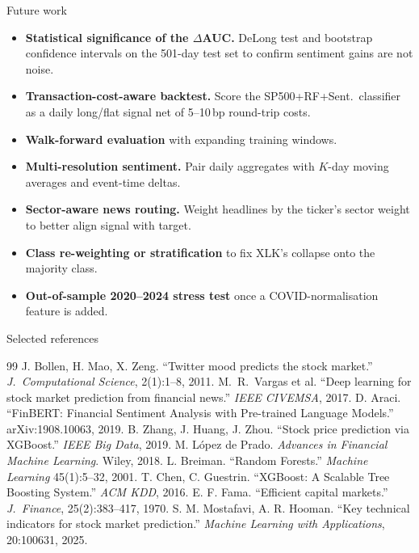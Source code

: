 \documentclass[aspectratio=169,11pt]{beamer}
\newcommand{\heading}[1]{{\color{TecBlue}\textbf{#1}}}
\begin{document}
\begin{frame}{Future work}
\footnotesize
\begin{itemize}\setlength\itemsep{2pt}
  \item \heading{Statistical significance of the $\Delta$AUC.} DeLong test and bootstrap confidence intervals on the 501-day test set to confirm sentiment gains are not noise.
  \item \heading{Transaction-cost-aware backtest.} Score the SP500+RF+Sent.\ classifier as a daily long/flat signal net of 5--10\,bp round-trip costs.
  \item \heading{Walk-forward evaluation} with expanding training windows.
  \item \heading{Multi-resolution sentiment.} Pair daily aggregates with $K$-day moving averages and event-time deltas.
  \item \heading{Sector-aware news routing.} Weight headlines by the ticker's sector weight to better align signal with target.
  \item \heading{Class re-weighting or stratification} to fix XLK's collapse onto the majority class.
  \item \heading{Out-of-sample 2020--2024 stress test} once a COVID-normalisation feature is added.
\end{itemize}
\end{frame}

\begin{frame}[allowframebreaks]{Selected references}
\small
\begin{thebibliography}{99}
 J. Bollen, H. Mao, X. Zeng. ``Twitter mood predicts the stock market.'' \textit{J.\ Computational Science}, 2(1):1--8, 2011.
 M.\ R.\ Vargas et al. ``Deep learning for stock market prediction from financial news.'' \textit{IEEE CIVEMSA}, 2017.
  D. Araci. ``FinBERT: Financial Sentiment Analysis with Pre-trained Language Models.'' arXiv:1908.10063, 2019.
 B. Zhang, J. Huang, J. Zhou. ``Stock price prediction via XGBoost.'' \textit{IEEE Big Data}, 2019.
  M. L\'opez de Prado. \textit{Advances in Financial Machine Learning}. Wiley, 2018.
 L. Breiman. ``Random Forests.'' \textit{Machine Learning} 45(1):5--32, 2001.
 T. Chen, C. Guestrin. ``XGBoost: A Scalable Tree Boosting System.'' \textit{ACM KDD}, 2016.
 E. F. Fama. ``Efficient capital markets.'' \textit{J.\ Finance}, 25(2):383--417, 1970.
 S. M. Mostafavi, A. R. Hooman. ``Key technical indicators for stock market prediction.'' \textit{Machine Learning with Applications}, 20:100631, 2025.
\end{thebibliography}
\end{frame}
\end{document}

